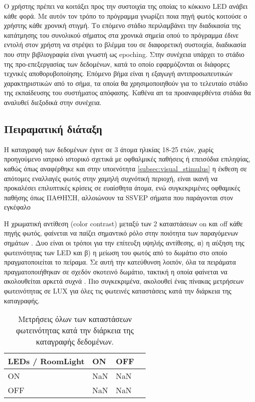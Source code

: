 \documentclass[11pt,a4paper,english,greek,twoside]{../Thesis}
\begin{document}
\par Ο χρήστης πρέπει να κοιτάξει προς την συστοιχία της οποίας το κόκκινο LED ανάβει κάθε φορά. Με αυτόν τον τρόπο το πρόγραμμα γνωρίζει ποια πηγή φωτός κοιτούσε ο χρήστης κάθε χρονική στιγμή. Το επόμενο στάδιο περιλαμβάνει την διαδικασία της κατάτμησης του συνολικού σήματος στα χρονικά σημεία οπού το πρόγραμμα έδινε εντολή στον χρήστη να στρέψει το βλέμμα του σε διαφορετική συστοιχία, διαδικασία που στην βιβλιογραφία είναι γνωστή ως epoching. Στην συνέχεια υπάρχει το στάδιο της προ-επεξεργασίας των δεδομένων, κατά το οποίο εφαρμόζονται οι διάφορες τεχνικές αποθορυβοποίησης. Επόμενο βήμα είναι η εξαγωγή αντιπροσωπευτικών χαρακτηριστικών από το σήμα, τα οποία θα χρησιμοποιηθούν για το τελευταίο στάδιο της εκπαίδευσης του συστήματος απόφασης. Καθένα απ τα προαναφερθέντα στάδια θα αναλυθεί διεξοδικά στην συνέχεια.

\subsection{Πειραματική διάταξη}
\par Η καταγραφή των δεδομένων έγινε σε 3 άτομα ηλικίας 18-25 ετών, χωρίς προηγούμενο ιατρικό ιστορικό σχετικά με οφθαλμικές παθήσεις ή επεισόδια επιληψίας, καθώς όπως αναφέρθηκε και στην υποενότητα \ref{subsec:visual_stimulus} η έκθεση σε απότομες εναλλαγές φωτός στην χαμηλή συχνότική περιοχή, είναι ικανή να προκαλέσει επιλυπτικές κρίσεις σε ευαίσθητα άτομα, ενώ συγκεκριμένες οφθαμικές παθήσης όπως ΠΑΘΗΣΗ, αλλοιώνουν τα SSVEP σήματα που παράγονται στον εγκέφαλο \cite{} 

\par Η χρωματική αντίθεση (color contrast) μεταξύ των 2 καταστάσεων  on και off κάθε πηγής φωτός, φαίνεται να παίζει σημαντικό ρόλο στην ποιότητα των παραγόμενων σημάτων \cite{}. Δυο είναι οι τρόποι για την επίτευξη υψηλής αντίθεσης, α) η αύξηση της φωτεινότητας των LED και β) η μείωση του φωτός από το δωμάτιο στο οποίο πραγματοποιείται το πείραμα. Σε αυτή την κατεύθυνση λοιπόν, όλα τα πειράματα πραγματοποιήθηκαν σε σχεδόν σκοτεινό δωμάτιο, τακτική η οποία φαίνεται να ακολουθείται αρκετά συχνά \cite{}. Πιο συγκεκριμένα, ακολουθεί ένας πίνακας μετρήσεων φωτεινότητας σε LUX για όλες τις φωτεινές καταστάσεις κατά την διάρκεια της καταγραφής.

\begin{table}[H]
	\centering
    \begin{tabular}{| l | l | l | l |}
    \hline
    \textbf{LEDs / RoomLight} & \textbf{ON} & \textbf{OFF}\\ \hline
    ON  & NaN & NaN \\ \hline
    OFF & NaN & NaN \\ \hline
    \hline
    \end{tabular}
	\caption{Μετρήσεις όλων των καταστάσεων φωτεινότητας κατά την διάρκεια της καταγραφής δεδομένων.}
	\label{tab:lux}
\end{table}
\end{document}

